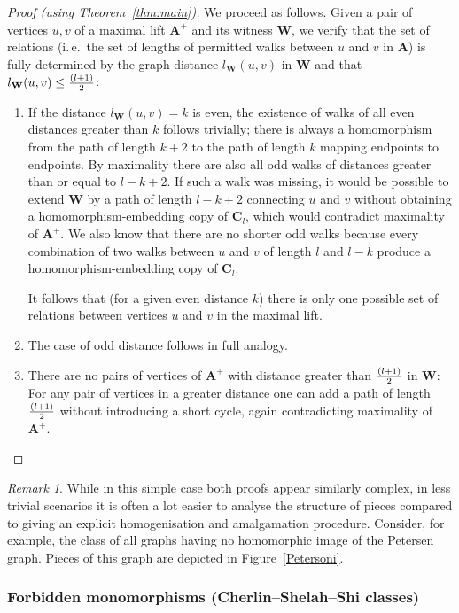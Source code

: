 \documentclass{elsarticle}
\newcommand{\ie}{i.\,e.}
\def\str#1{\mathbf {#1}}
\theoremstyle{plain}
\theoremstyle{definition}
\theoremstyle{remark}
\newtheorem*{remark}{Remark}
\begin{document}
\begin{proof}[Proof (using Theorem~\ref{thm:main})]
We proceed as follows.
Given a pair of vertices $u,v$  of a maximal lift $\str{A}^+$ and its witness $\str{W}$, we verify that the set of
relations (\ie{}\ the set of lengths of permitted walks between $u$ and $v$ in $\str{A}$) is fully determined by the graph distance $l_\str{W}(u,v)$ in $\str{W}$ and that $l_\str{W}(u,v)\leq {(l+1)\over 2}$:
\begin{enumerate}
 \item If the distance $l_\str{W}(u,v)=k$ is even, the existence of walks of all even distances greater than $k$ follows trivially; there is always a homomorphism from the path of length $k+2$ to the path of length $k$ mapping endpoints to endpoints. By maximality there are also all odd walks of distances greater than or equal to $l-k+2$. If such a walk was missing, it would be possible to extend $\str{W}$ by a path of length $l-k+2$ connecting $u$ and $v$ without obtaining a homomorphism-embedding copy of $\str{C}_l$, which would contradict maximality of $\str{A}^+$. We also know that there are no shorter odd walks because every combination of two walks between $u$ and $v$ of length $l$ and $l-k$ produce a homomorphism-embedding copy of $\str{C}_l$.

It follows that (for a given even distance $k$) there is only one possible set of relations between vertices $u$ and $v$ in the maximal lift.
 \item The case of odd distance follows in full analogy.
 \item There are no pairs of vertices of $\str{A}^+$ with distance greater than $(l+1)\over 2$ in $\str{W}$: For any pair of vertices in a greater distance one can add a path of length $(l+1)\over 2$ without introducing a short cycle, again contradicting  maximality of $\str{A}^+$.
\end{enumerate}
\end{proof}
\begin{remark}
While in this simple case both proofs appear similarly complex, in less trivial scenarios it is often a lot easier to analyse the structure of pieces compared to giving an explicit homogenisation and amalgamation procedure. Consider, for example, the class of all graphs having no homomorphic image of the Petersen graph. Pieces of this graph are depicted in Figure~\ref{Petersoni}.
\end{remark}






\subsubsection {Forbidden monomorphisms (Cherlin--Shelah--Shi classes)}
\label{sec:CSS}
\end{document}
